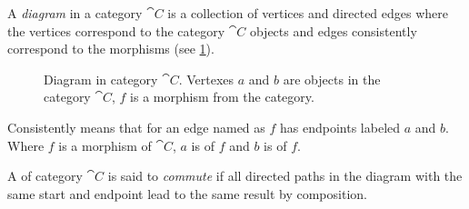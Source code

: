 \begin{definition}[Diagram]
  \label{def:diagram}
  A \textit{diagram} in a category $\cat{C}$ is a collection of
  vertices and directed edges where the vertices correspond to the
  category $\cat{C}$ objects and edges consistently correspond to the
  morphisms (see \ref{fig:diagramm}).

  \begin{figure}[H]
    \centering
    \caption{Diagram in category $\cat{C}$. Vertexes $a$ and $b$ are
      objects in the category $\cat{C}$, $f$ is a morphism from the category.}
   \label{fig:diagramm}
  \end{figure}

  
  Consistently means that for an edge named as $f$ has endpoints
  labeled $a$ and $b$. Where $f$ is a morphism of $\cat{C}$, $a$ is  of $f$ and
  $b$ is  of $f$. 
\end{definition}

\begin{definition}
  \label{def:commutative_diagram}
  A  of category $\cat{C}$ is said to
  \textit{commute} if all directed paths in the diagram with the same
  start and endpoint lead to the same result by composition.
\end{definition}

